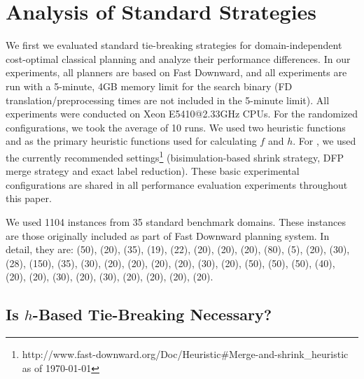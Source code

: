 \section{Analysis of Standard Strategies}
\label{sec:eval-common-strategies}

We first 
we evaluated standard tie-breaking strategies for domain-independent cost-optimal
classical planning and analyze their performance differences.  
In our experiments, all planners are based on Fast
Downward, and all experiments are run with a 5-minute,
4GB memory limit for the search binary (FD translation/preprocessing
times are not included in the 5-minute limit).  All experiments were
conducted on Xeon E5410@2.33GHz CPUs. For the randomized configurations, we took the average of 10 runs.
% 
We used two \sota heuristic functions \lmcut \cite{Helmert2009} and \mands \cite{HelmertHHN14} as the primary
heuristic functions used for calculating $f$ and $h$.  For \mands, we used the currently recommended
settings\footnote{http://www.fast-downward.org/Doc/Heuristic\#Merge-and-shrink\_heuristic as of \today}
(bisimulation-based shrink strategy, DFP merge strategy and exact label reduction).  These basic experimental
configurations are shared in all performance evaluation experiments throughout this paper. 

We used 1104 instances from 35 standard benchmark domains. These
instances are those originally included as part of Fast
Downward planning system. In detail, they are: (50),
(20), (35), (19), (22), (20),
(20), (20), (80), (5),
(20), (30), (28), (150), (35),
(30), (20), (20),
(20), (20), (30),
(20), (50), (50),
(50), (40), (20), (20),
(30), (20), (30), (20),
(20), (20), (20).

\subsection{Is $h$-Based Tie-Breaking Necessary?}


